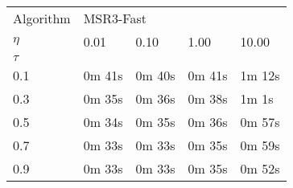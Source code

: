 \begin{tabular}{l||llll}
\toprule
Algorithm & \multicolumn{4}{l}{MSR3-Fast} \\
$\eta$ &     0.01  &   0.10  &   1.00  &   10.00 \\
\hline \hline
$\tau$ &           &         &         &         \\
0.1 &    0m 41s &  0m 40s &  0m 41s &  1m 12s \\
0.3 &    0m 35s &  0m 36s &  0m 38s &   1m 1s \\
0.5 &    0m 34s &  0m 35s &  0m 36s &  0m 57s \\
0.7 &    0m 33s &  0m 33s &  0m 35s &  0m 59s \\
0.9 &    0m 33s &  0m 33s &  0m 35s &  0m 52s \\
\bottomrule
\end{tabular}
